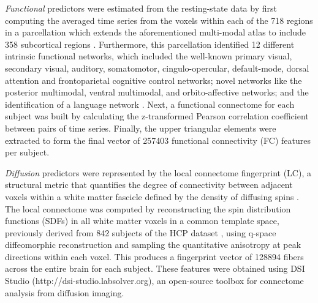 \documentclass[10pt,letterpaper]{article}
\begin{document}
{\it Functional} predictors were estimated from the resting-state data by first computing the averaged time series from the voxels within each of the 718 regions in a parcellation which extends the aforementioned multi-modal atlas to include 358 subcortical regions \cite{ji_mapping_2019}. Furthermore, this parcellation identified 12 different intrinsic functional networks,  which included the well-known primary visual, secondary visual, auditory, somatomotor, cingulo-opercular, default-mode, dorsal  attention and frontoparietal  cognitive  control  networks; novel  networks like  the  posterior  multimodal,  ventral  multimodal,  and  orbito-affective networks; and the identification of a language network \cite{ji_mapping_2019}.   Next, a functional connectome for each subject was built by calculating the z-transformed Pearson correlation coefficient between pairs of time series. Finally, the upper triangular elements were extracted to form the final vector of 257403 functional connectivity (FC) features per subject.

{\it Diffusion} predictors were represented by the local connectome fingerprint (LC), a structural metric that quantifies the degree of connectivity between adjacent voxels within a white matter fascicle defined by the density of diffusing spins \cite{yeh_connectometry_2016}. 
The local connectome was computed by reconstructing the spin distribution functions (SDFs) in all white matter voxels in a common template space, previously derived from 842 subjects of the HCP dataset \cite{YEH201857}, using q-space diffeomorphic reconstruction \cite{YEH201191} and sampling the quantitative anisotropy \cite{yeh_generalized_2010} at peak directions within each voxel. This produces a fingerprint vector of 128894 fibers across the entire brain for each subject. These features were obtained using DSI Studio (http://dsi-studio.labsolver.org), an open-source toolbox for connectome analysis from diffusion imaging.  
\end{document}

